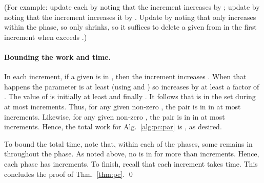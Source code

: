 (For example:
update each  by noting that the increment
increases  by ;
update  by noting that the increment increases 
it by .
Update  by noting that  only increases within the phase,
so  only shrinks, so it suffices to delete a given  from 
in the first increment when  exceeds .)

\paragraph{Bounding the work and time.}
In each increment, if a given  is in , then the increment increases .
When that happens the parameter  is at least 
(using  and )
so  increases by at least a factor of .
The value of  is initially at least 
and finally .
It follows that  is in the set  during at most  increments.
Thus, for any given non-zero , the pair  is in 
in at most  increments.
Likewise, for any given non-zero , the pair  is in 
in at most  increments.
Hence, the total work for Alg.~\ref{alg:pc:par}
is , as desired.

To bound the total time, note that, within each of the  phases,
some  remains in  throughout the phase.
As noted above, no  is in  for more than  increments.
Hence, each phase has  increments.
To finish, recall that each increment takes  time.
This concludes the proof of Thm.~\ref{thm:pc}. \hfill \qed


